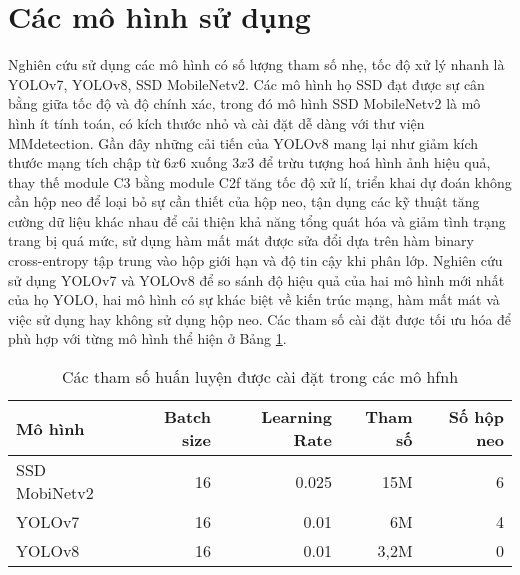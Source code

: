 \documentclass[../the.tex]{subfiles}
\begin{document}
\section{Các mô hình sử dụng}
\label{sec:model}


{\fontsize{13}{12} \selectfont

	Nghiên cứu sử dụng các mô hình có số lượng tham số nhẹ, tốc độ xử lý nhanh là YOLOv7, YOLOv8, SSD MobileNetv2.
	Các mô hình họ SSD đạt được sự cân bằng giữa tốc độ và độ chính xác, trong đó mô hình
	SSD MobileNetv2 là mô hình ít tính toán, có kích thước nhỏ và cài đặt dễ dàng với thư viện MMdetection.
	Gần đây những cải tiến của YOLOv8 mang lại như giảm kích thước mạng tích chập từ $6x6$ xuống $3x3$ để trừu tượng hoá hình ảnh hiệu quả, thay thế module C3 bằng module C2f tăng tốc độ xử lí, triển khai dự đoán không cần hộp neo để loại bỏ sự cần thiết của hộp neo,
	tận dụng các kỹ thuật tăng cường dữ liệu khác nhau để cải thiện khả năng tổng quát hóa và giảm tình trạng trang bị quá mức, sử dụng hàm mất mát được sửa đổi dựa trên hàm binary cross-entropy tập trung vào hộp giới hạn và độ tin cậy khi phân lớp.
	Nghiên cứu sử dụng YOLOv7 và YOLOv8 để so sánh độ hiệu quả của hai mô hình mới nhất của họ YOLO, hai mô hình có sự khác biệt về kiến trúc mạng, hàm mất mát và việc sử dụng hay không sử dụng hộp neo.
	Các tham số cài đặt được tối ưu hóa để phù hợp với từng mô hình thể hiện ở Bảng \ref{tab:caidat}.

}


\begin{table}[H]
	\centering
	\caption{Các tham số huấn luyện được cài đặt trong các mô hfnh}
	\begin{tabular}{|l|r|r|r|r|}
		\hline
		\textbf{Mô hình} & \textbf{Batch size} & \textbf{Learning Rate} & \textbf{Tham số} & \textbf{Số hộp neo} \\ \hline
		SSD MobiNetv2    & 16                  & 0.025                 & 15M         & 6                   \\ \hline
		YOLOv7           & 16                  & 0.01                   & 6M          & 4                   \\ \hline
		YOLOv8           & 16                  & 0.01                   & 3,2M        & 0                   \\ \hline
	\end{tabular}
	\label{tab:caidat}
\end{table}
\end{document}
